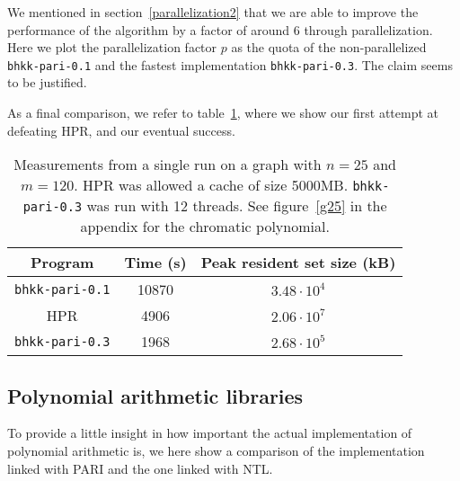 \documentclass{cslthse-msc}
\newcommand{\code}{\texttt}
\begin{document}
We mentioned in section~\ref{parallelization2} that we are able to improve the performance of the algorithm by a factor of around 6 through parallelization. Here we plot the parallelization factor $p$ as the quota of the non-parallelized \code{bhkk-pari-0.1} and the fastest implementation \code{bhkk-pari-0.3}. The claim seems to be justified.



As a final comparison, we refer to table~\ref{improvements}, where we show our first attempt at defeating HPR, and our eventual success.

\begin{table}[t]\centering
\begin{tabular}{c|cc} \hline
  Program & Time (s) & Peak resident set size (kB) \\ \hline
  \code{bhkk-pari-0.1} & 10870 & $3.48 \cdot 10^{4}$ \\ \hline
  HPR & 4906 & $2.06 \cdot 10^{7}$ \\ \hline
  \code{bhkk-pari-0.3} & 1968 & $2.68 \cdot 10^{5}$ \\ \hline
\end{tabular}
\caption{Measurements from a single run on a graph with $n = 25$ and $m = 120$. HPR was allowed a cache of size 5000MB. \code{bhkk-pari-0.3} was run with 12 threads. See figure~\ref{g25} in the appendix for the chromatic polynomial.}
\label{improvements}
\end{table}

\subsection{Polynomial arithmetic libraries}
To provide a little insight in how important the actual implementation of polynomial arithmetic is, we here show a comparison of the implementation linked with PARI and the one linked with NTL.
\end{document}
